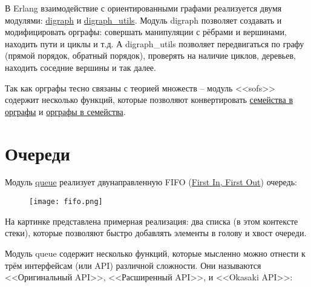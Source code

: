 В Erlang взаимодействие с ориентированными графами реализуется двумя модулями: \href{http://erldocs.com/R15B/stdlib/digraph.html}{digraph} и \href{http://erldocs.com/R15B/stdlib/digraph\_utils}{digraph\_utils}.
Модуль digraph позволяет создавать и модифицировать орграфы: совершать манипуляции с рёбрами и вершинами, находить пути и циклы и т.д.
А digraph\_utils позволяет передвигаться по графу (прямой порядок, обратный порядок), проверять на наличие циклов, деревьев, находить соседние вершины и так далее.

Так как орграфы тесно связаны с теорией множеств \---  модуль <<sofs>> содержит несколько функций, которые позволяют конвертировать \href{http://erldocs.com/R15B/stdlib/sofs.html\#family\_to\_digraph/2}{семейства в орграфы} и \href{http://erldocs.com/R15B/stdlib/sofs.html\#digraph\_to\_family/2}{орграфы в семейства}.
\section{Очереди}
\label{queues}
Модуль \href{http://erldocs.com/R15B/stdlib/queue.html}{queue} реализует двунаправленную FIFO (\href{http://en.wikipedia.org/wiki/FIFO\_(computing)}{First In, First Out}) очередь:
\begin{figure}[h!]
    \centering
    \texttt{[image: fifo.png]}
\end{figure}
На картинке представлена примерная реализация: два списка (в этом контексте стеки), которые позволяют быстро добавлять элементы в голову и хвост очереди.

Модуль queue содержит несколько функций, которые мысленно можно отнести к трём интерфейсам (или API) различной сложности.
Они называются <<Оригинальный API>>, <<Расширенный API>>, и <<Okasaki API>>:
\\

